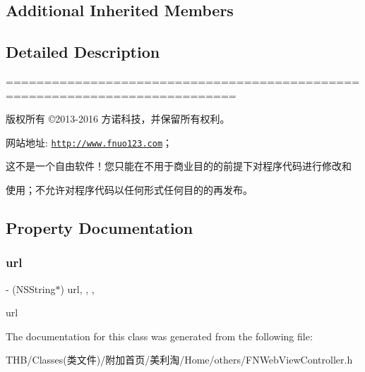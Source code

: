 \subsection*{Additional Inherited Members}


\subsection{Detailed Description}
============================================================================

版权所有 ©2013-\/2016 方诺科技，并保留所有权利。

网站地址\+: \href{http://www.fnuo123.com}{\tt http\+://www.\+fnuo123.\+com}； 



这不是一个自由软件！您只能在不用于商业目的的前提下对程序代码进行修改和

使用；不允许对程序代码以任何形式任何目的的再发布。 

 

\subsection{Property Documentation}
\mbox{\label{interface_f_n_web_view_controller_a4b40a192cf94637e4d50c3efde51042d}} 
\subsubsection{\texorpdfstring{url}{url}}
{\footnotesize\ttfamily -\/ (N\+S\+String$\ast$) url\hspace{0.3cm}{\ttfamily [read]}, {\ttfamily [write]}, {\ttfamily [nonatomic]}, {\ttfamily [copy]}}

url 

The documentation for this class was generated from the following file\+:\begin{DoxyCompactItemize}
\item 
T\+H\+B/\+Classes(类文件)/附加首页/美利淘/\+Home/others/F\+N\+Web\+View\+Controller.\+h\end{DoxyCompactItemize}
